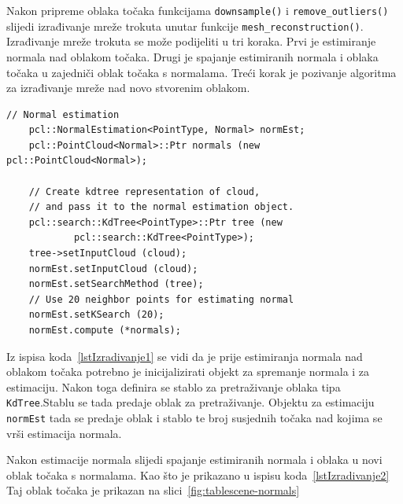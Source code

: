 Nakon pripreme oblaka točaka funkcijama \texttt{downsample()} i
\texttt{remove\_outliers()} slijedi izrađivanje mreže trokuta unutar
funkcije \texttt{mesh\_reconstruction()}. Izrađivanje mreže trokuta se
može podijeliti u tri koraka. Prvi je estimiranje normala nad oblakom
točaka. Drugi je spajanje estimiranih normala i oblaka točaka u
zajedniči oblak točaka s normalama. Treći korak je pozivanje algoritma
za izrađivanje mreže nad novo stvorenim oblakom.

\begin{lstlisting}[label=lstIzradivanje1, caption={Dio izvornog koda iz
funkcije \texttt{reconstruct\_mesh()} }]
    // Normal estimation
    pcl::NormalEstimation<PointType, Normal> normEst;
    pcl::PointCloud<Normal>::Ptr normals (new pcl::PointCloud<Normal>);
    
    // Create kdtree representation of cloud, 
    // and pass it to the normal estimation object. 
    pcl::search::KdTree<PointType>::Ptr tree (new
            pcl::search::KdTree<PointType>);
    tree->setInputCloud (cloud);
    normEst.setInputCloud (cloud);
    normEst.setSearchMethod (tree);
    // Use 20 neighbor points for estimating normal
    normEst.setKSearch (20);
    normEst.compute (*normals);
\end{lstlisting}

Iz ispisa koda~\ref{lstIzradivanje1} se vidi da je prije estimiranja
normala nad oblakom točaka potrebno je inicijalizirati objekt za
spremanje normala i za estimaciju. Nakon toga definira se
stablo za pretraživanje oblaka tipa \texttt{KdTree}.\footnotemark[3]
Stablu se tada predaje oblak za pretraživanje. Objektu za
estimaciju \texttt{normEst} tada se predaje oblak i stablo te broj
susjednih točaka nad kojima se vrši estimacija
normala\footnotemark[4]. 


Nakon estimacije normala slijedi spajanje estimiranih normala i oblaka u
novi oblak točaka s normalama. Kao što je prikazano u ispisu
koda~\ref{lstIzradivanje2} Taj oblak točaka je prikazan na 
slici~\ref{fig:tablescene-normals}

